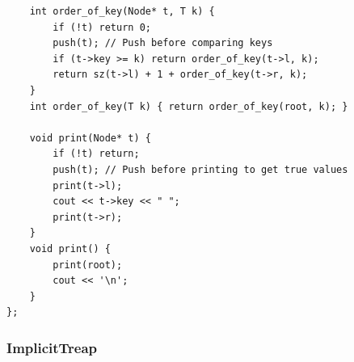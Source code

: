 \documentclass[9pt,a4paper,twocolumn]{extarticle}
\begin{document}
\begin{lstlisting}
    int order_of_key(Node* t, T k) {
        if (!t) return 0;
        push(t); // Push before comparing keys
        if (t->key >= k) return order_of_key(t->l, k);
        return sz(t->l) + 1 + order_of_key(t->r, k);
    }
    int order_of_key(T k) { return order_of_key(root, k); }

    void print(Node* t) {
        if (!t) return;
        push(t); // Push before printing to get true values
        print(t->l);
        cout << t->key << " ";
        print(t->r);
    }
    void print() {
        print(root);
        cout << '\n';
    }
};
\end{lstlisting}

\filbreak
\subsubsection{ImplicitTreap}
\nopagebreak
\end{document}

